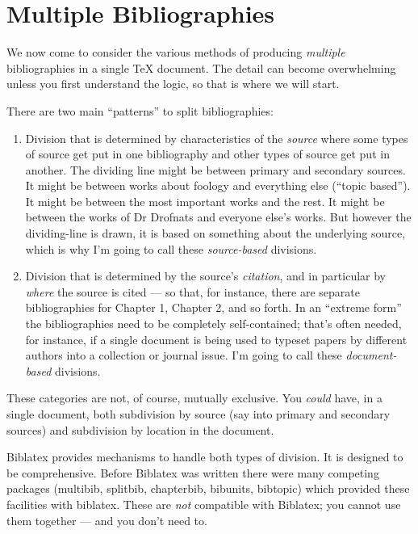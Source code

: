\chapter{Multiple Bibliographies}

We now come to consider the various methods of producing \emph{multiple}
bibliographies in a single TeX document. The detail can become
overwhelming unless you first understand the logic, so that is where we
will start.

There are two main ``patterns'' to split bibliographies:

\begin{enumerate}
\item
  Division that is determined by characteristics of the \emph{source}
  where some types of source get put in one bibliography and other types
  of source get put in another. The dividing line might be between
  primary and secondary sources. It might be between works about foology
  and everything else (``topic based''). It might be between the most
  important works and the rest. It might be between the works of Dr
  Drofnats and everyone else's works. But however the dividing-line is
  drawn, it is based on something about the underlying source, which is
  why I'm going to call these \emph{source-based} divisions.
\item
  Division that is determined by the source's \emph{citation}, and in
  particular by \emph{where} the source is cited --- so that, for
  instance, there are separate bibliographies for Chapter 1, Chapter 2,
  and so forth. In an ``extreme form'' the bibliographies need to be
  completely self-contained; that's often needed, for instance, if a
  single document is being used to typeset papers by different authors
  into a collection or journal issue. I'm going to call these
  \emph{document-based} divisions.
\end{enumerate}
These categories are not, of course, mutually exclusive. You
\emph{could} have, in a single document, both subdivision by source (say
into primary and secondary sources) and subdivision by location in the
document.

Biblatex provides mechanisms to handle both types of division. It is
designed to be comprehensive. Before Biblatex was written there were
many competing packages (multibib, splitbib, chapterbib, bibunits,
bibtopic) which provided these facilities with biblatex. These are
\emph{not} compatible with Biblatex; you cannot use them together ---
and you don't need to.

